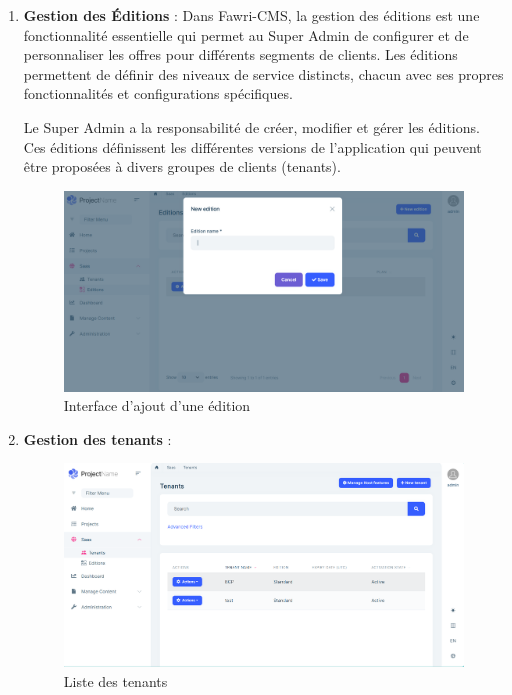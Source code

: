 \begin{enumerate}
    \item \textbf{Gestion des Éditions} :
          Dans Fawri-CMS, la gestion des éditions est une fonctionnalité essentielle qui permet au Super Admin de configurer et de personnaliser les offres pour différents segments de clients. Les éditions permettent de définir des niveaux de service distincts, chacun avec ses propres fonctionnalités et configurations spécifiques.

          Le Super Admin a la responsabilité de créer, modifier et gérer les éditions. Ces éditions définissent les différentes versions de l'application qui peuvent être proposées à divers groupes de clients (tenants).

          \begin{figure}[H]
              \centering
              \includegraphics[width=17cm]{Figures/new edition.PNG}
              \caption{Interface d'ajout d'une édition}
          \end{figure}

    \item \textbf{Gestion des tenants} :

          \begin{figure}[H]
              \centering
              \includegraphics[width=17cm]{Figures/tenant screenshot.PNG}
              \caption{Liste des tenants}
          \end{figure}


\end{enumerate}
